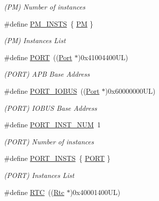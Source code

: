 \begin{DoxyCompactItemize}
\begin{DoxyCompactList}\small\item\em (PM) Number of instances \end{DoxyCompactList}\item 
\#define \mbox{\hyperlink{group___s_a_m_d21_e15_l__base_ga8706ce17cb90c1800b8bccd415e9251d}{P\+M\+\_\+\+I\+N\+S\+TS}}~\{ \mbox{\hyperlink{group___s_a_m_d21_j18_a__base_ga23c7d58108d99a089ce0824823e6b950}{PM}} \}
\begin{DoxyCompactList}\small\item\em (PM) Instances List \end{DoxyCompactList}\item 
\#define \mbox{\hyperlink{group___s_a_m_d21_e15_l__base_ga614217d263be1fb1a5f76e2ff7be19a2}{P\+O\+RT}}~((\mbox{\hyperlink{struct_port}{Port}}     $\ast$)0x41004400\+U\+L)
\begin{DoxyCompactList}\small\item\em (P\+O\+RT) A\+PB Base Address \end{DoxyCompactList}\item 
\#define \mbox{\hyperlink{group___s_a_m_d21_e15_l__base_gafb94fe0c3ae0b887c1b1c49bf65dea12}{P\+O\+R\+T\+\_\+\+I\+O\+B\+US}}~((\mbox{\hyperlink{struct_port}{Port}}     $\ast$)0x60000000\+U\+L)
\begin{DoxyCompactList}\small\item\em (P\+O\+RT) I\+O\+B\+US Base Address \end{DoxyCompactList}\item 
\#define \mbox{\hyperlink{group___s_a_m_d21_e15_l__base_gac581aef3aa2ab0b067ee84aa3443be17}{P\+O\+R\+T\+\_\+\+I\+N\+S\+T\+\_\+\+N\+UM}}~1
\begin{DoxyCompactList}\small\item\em (P\+O\+RT) Number of instances \end{DoxyCompactList}\item 
\#define \mbox{\hyperlink{group___s_a_m_d21_e15_l__base_ga58dbd6d300ad7fca1c3f7a685edd26de}{P\+O\+R\+T\+\_\+\+I\+N\+S\+TS}}~\{ \mbox{\hyperlink{group___s_a_m_d21_j18_a__base_ga614217d263be1fb1a5f76e2ff7be19a2}{P\+O\+RT}} \}
\begin{DoxyCompactList}\small\item\em (P\+O\+RT) Instances List \end{DoxyCompactList}\item 
\#define \mbox{\hyperlink{group___s_a_m_d21_e15_l__base_ga5359a088f5d8b20ce74d920e46059304}{R\+TC}}~((\mbox{\hyperlink{union_rtc}{Rtc}}      $\ast$)0x40001400\+U\+L)

\end{DoxyCompactItemize}
